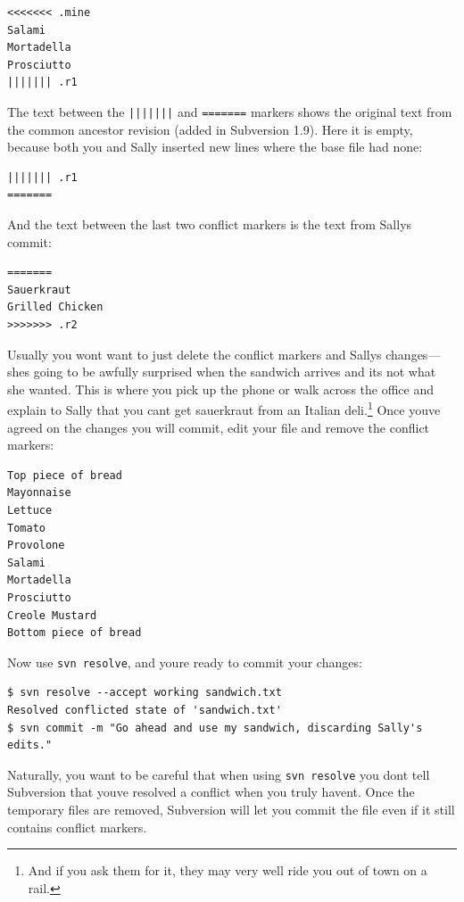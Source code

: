 \begin{verbatim}
<<<<<<< .mine
Salami
Mortadella
Prosciutto
||||||| .r1
\end{verbatim}

The text between the \texttt{|||||||} and \texttt{=======} markers shows
the original text from the common ancestor revision (added in Subversion
1.9). Here it is empty, because both you and Sally inserted new lines
where the base file had none:

\begin{verbatim}
||||||| .r1
=======
\end{verbatim}

And the text between the last two conflict markers is the text from
Sally\textquotesingle s commit:

\begin{verbatim}
=======
Sauerkraut
Grilled Chicken
>>>>>>> .r2
\end{verbatim}

Usually you won\textquotesingle t want to just delete the conflict
markers and Sally\textquotesingle s changes---she\textquotesingle s
going to be awfully surprised when the sandwich arrives and
it\textquotesingle s not what she wanted. This is where you pick up the
phone or walk across the office and explain to Sally that you
can\textquotesingle t get sauerkraut from an Italian deli.\footnote{And
  if you ask them for it, they may very well ride you out of town on a
  rail.} Once you\textquotesingle ve agreed on the changes you will
commit, edit your file and remove the conflict markers:

\begin{verbatim}
Top piece of bread
Mayonnaise
Lettuce
Tomato
Provolone
Salami
Mortadella
Prosciutto
Creole Mustard
Bottom piece of bread
\end{verbatim}

Now use \texttt{svn\ resolve}, and you\textquotesingle re ready to
commit your changes:

\begin{verbatim}
$ svn resolve --accept working sandwich.txt
Resolved conflicted state of 'sandwich.txt'
$ svn commit -m "Go ahead and use my sandwich, discarding Sally's edits."
\end{verbatim}

Naturally, you want to be careful that when using \texttt{svn\ resolve}
you don\textquotesingle t tell Subversion that you\textquotesingle ve
resolved a conflict when you truly haven\textquotesingle t. Once the
temporary files are removed, Subversion will let you commit the file
even if it still contains conflict markers.


